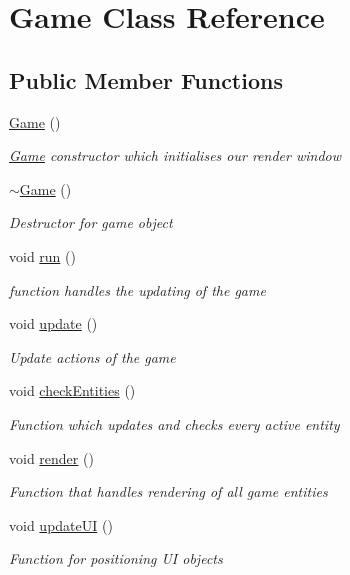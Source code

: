 \hypertarget{class_game}{}\section{Game Class Reference}
\label{class_game}
\subsection*{Public Member Functions}
\begin{DoxyCompactItemize}
\item 
\mbox{\hyperlink{class_game_ad59df6562a58a614fda24622d3715b65}{Game}} ()
\begin{DoxyCompactList}\small\item\em \mbox{\hyperlink{class_game}{Game}} constructor which initialises our render window \end{DoxyCompactList}\item 
\mbox{\hyperlink{class_game_ae3d112ca6e0e55150d2fdbc704474530}{$\sim$\+Game}} ()
\begin{DoxyCompactList}\small\item\em Destructor for game object \end{DoxyCompactList}\item 
void \mbox{\hyperlink{class_game_a1ab78f5ed0d5ea879157357cf2fb2afa}{run}} ()
\begin{DoxyCompactList}\small\item\em function handles the updating of the game \end{DoxyCompactList}\item 
void \mbox{\hyperlink{class_game_a79df6376b332d63c9eca0dcee30305c3}{update}} ()
\begin{DoxyCompactList}\small\item\em Update actions of the game \end{DoxyCompactList}\item 
void \mbox{\hyperlink{class_game_a0f45755826070a27ccc98e32deca5d87}{check\+Entities}} ()
\begin{DoxyCompactList}\small\item\em Function which updates and checks every active entity \end{DoxyCompactList}\item 
void \mbox{\hyperlink{class_game_a15ddd769261d923827a3cdf41499c843}{render}} ()
\begin{DoxyCompactList}\small\item\em Function that handles rendering of all game entities \end{DoxyCompactList}\item 
void \mbox{\hyperlink{class_game_a9f1f11b62bf54070912cb94ad8e990df}{update\+UI}} ()
\begin{DoxyCompactList}\small\item\em Function for positioning UI objects \end{DoxyCompactList}\end{DoxyCompactItemize}
